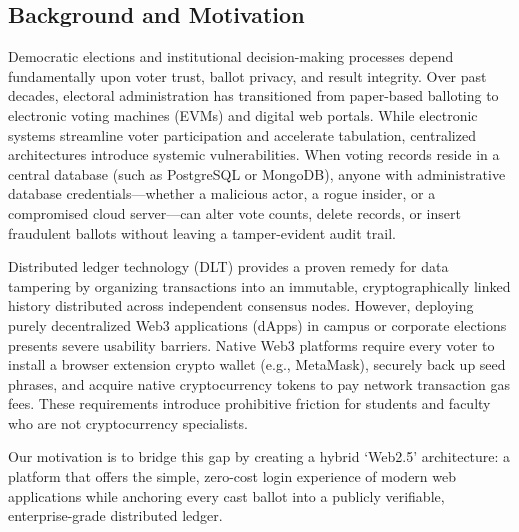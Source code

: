 \documentclass[12pt, a4paper]{article}
\begin{document}
\subsection{Background and Motivation}
Democratic elections and institutional decision-making processes depend fundamentally upon voter trust, ballot privacy, and result integrity. Over past decades, electoral administration has transitioned from paper-based balloting to electronic voting machines (EVMs) and digital web portals. While electronic systems streamline voter participation and accelerate tabulation, centralized architectures introduce systemic vulnerabilities. When voting records reside in a central database (such as PostgreSQL or MongoDB), anyone with administrative database credentials---whether a malicious actor, a rogue insider, or a compromised cloud server---can alter vote counts, delete records, or insert fraudulent ballots without leaving a tamper-evident audit trail.

Distributed ledger technology (DLT) provides a proven remedy for data tampering by organizing transactions into an immutable, cryptographically linked history distributed across independent consensus nodes. However, deploying purely decentralized Web3 applications (dApps) in campus or corporate elections presents severe usability barriers. Native Web3 platforms require every voter to install a browser extension crypto wallet (e.g., MetaMask), securely back up seed phrases, and acquire native cryptocurrency tokens to pay network transaction gas fees. These requirements introduce prohibitive friction for students and faculty who are not cryptocurrency specialists.

Our motivation is to bridge this gap by creating a hybrid `Web2.5' architecture: a platform that offers the simple, zero-cost login experience of modern web applications while anchoring every cast ballot into a publicly verifiable, enterprise-grade distributed ledger.
\end{document}
